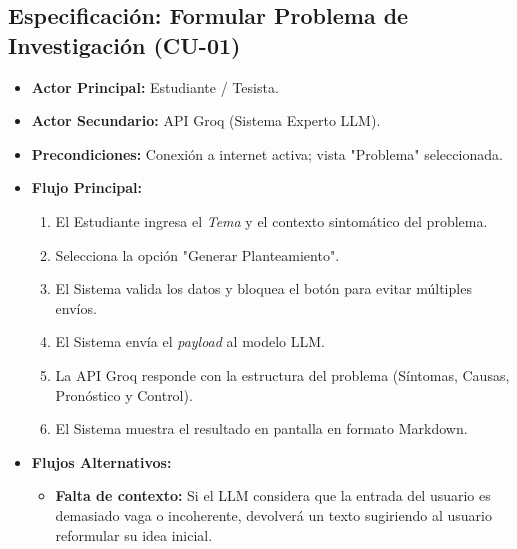 \subsection{Especificación: Formular Problema de Investigación (CU-01)}
\begin{itemize}
    \item \textbf{Actor Principal:} Estudiante / Tesista.
    \item \textbf{Actor Secundario:} API Groq (Sistema Experto LLM).
    \item \textbf{Precondiciones:} Conexión a internet activa; vista "Problema" seleccionada.
    \item \textbf{Flujo Principal:}
    \begin{enumerate}
        \item El Estudiante ingresa el \textit{Tema} y el contexto sintomático del problema.
        \item Selecciona la opción "Generar Planteamiento".
        \item El Sistema valida los datos y bloquea el botón para evitar múltiples envíos.
        \item El Sistema envía el \textit{payload} al modelo LLM.
        \item La API Groq responde con la estructura del problema (Síntomas, Causas, Pronóstico y Control).
        \item El Sistema muestra el resultado en pantalla en formato Markdown.
    \end{enumerate}
    \item \textbf{Flujos Alternativos:} 
    \begin{itemize}
        \item \textbf{Falta de contexto:} Si el LLM considera que la entrada del usuario es demasiado vaga o incoherente, devolverá un texto sugiriendo al usuario reformular su idea inicial.
    \end{itemize}
\end{itemize}

